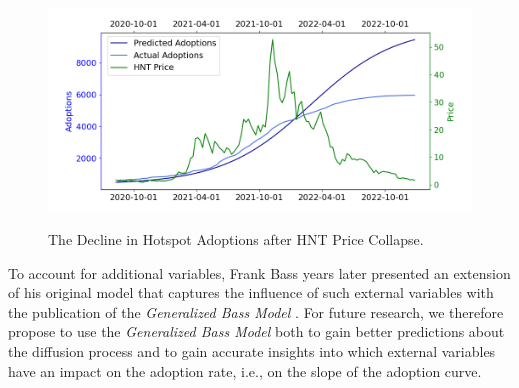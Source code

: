 \documentclass{article}
\begin{document}
\begin{figure}[!hptb]
    \centering{}\includegraphics[scale=0.6]{plots/hnt_comparison.png}\\
    \caption{The Decline in Hotspot Adoptions after HNT Price Collapse.}
\end{figure}

\noindent To account for additional variables, Frank Bass years later presented an extension of his original model that captures the influence of such external variables with the
publication of the \emph{Generalized Bass Model} \citep{bass1994bass}. For future research, we therefore propose to use the \emph{Generalized Bass Model} both to gain better
predictions about the diffusion process and to gain accurate insights into which external variables have an impact on the adoption rate, i.e., on the slope of the adoption curve.


\setcounter{secnumdepth}{0}

 
 
\end{document}
